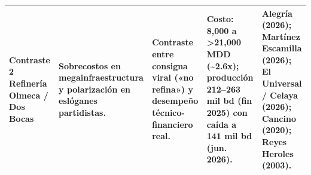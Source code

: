 \documentclass[12pt,letterpaper,oneside]{article}
\begin{document}
\begin{landscape}
\begin{table}[H]
\begin{tabular}{@{}p{2cm}p{2.5cm}p{3.5cm}p{4cm}p{6.5cm}@{}}
\addlinespace
Contraste 2 \newline Refinería Olmeca / Dos Bocas & Sobrecostos en megainfraestructura y polarización en eslóganes partidistas. & Contraste entre consigna viral («no refina») y desempeño técnico-financiero real. & Costo: 8,000 a >21,000 MDD (\textasciitilde2.6x); producción 212--263 mil bd (fin 2025) con caída a 141 mil bd (jun. 2026). & Alegría (2026); Martínez Escamilla (2026); El Universal / Celaya (2026); Cancino (2020); Reyes Heroles (2003). \\
\bottomrule
\end{tabular}
\end{table}
\end{landscape}

\clearpage
\end{document}
